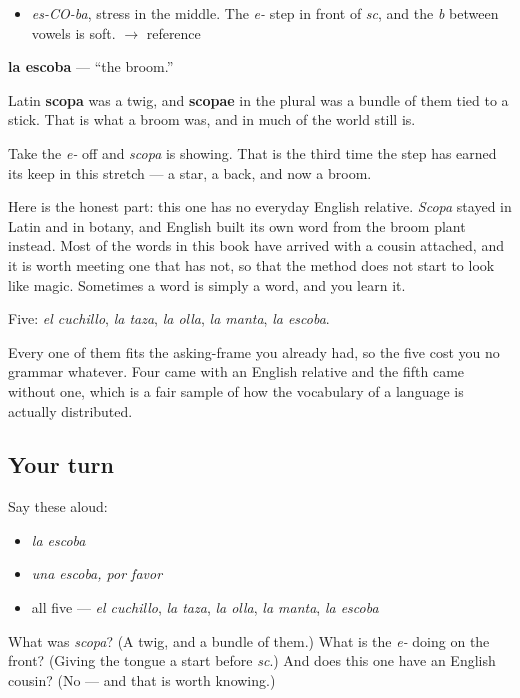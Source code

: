 \begin{sounds}
\begin{itemize}
\raggedright
  \item \emph{es-CO-ba}, stress in the middle. The \emph{e-} step in front of \emph{sc}, and the \emph{b} between vowels is soft. $\to$ reference
\end{itemize}
\end{sounds}

\begin{cousinweb}
\textbf{la escoba} — \textquotedblleft{}the broom.\textquotedblright{}

Latin \textbf{scopa} was a twig, and \textbf{scopae} in the plural was a bundle of them tied to a stick. That is what a broom was, and in much of the world still is.

Take the \emph{e-} off and \emph{scopa} is showing. That is the third time the step has earned its keep in this stretch — a star, a back, and now a broom.

Here is the honest part: this one has no everyday English relative. \emph{Scopa} stayed in Latin and in botany, and English built its own word from the broom plant instead. Most of the words in this book have arrived with a cousin attached, and it is worth meeting one that has not, so that the method does not start to look like magic. Sometimes a word is simply a word, and you learn it.
\end{cousinweb}

\begin{grammarlens}[title={What you've built}]
Five: \emph{el cuchillo}, \emph{la taza}, \emph{la olla}, \emph{la manta}, \emph{la escoba}.

Every one of them fits the asking-frame you already had, so the five cost you no grammar whatever. Four came with an English relative and the fifth came without one, which is a fair sample of how the vocabulary of a language is actually distributed.
\end{grammarlens}

\subsection*{Your turn}
Say these aloud:

\begin{itemize}
\raggedright
  \item \emph{la escoba}
  \item \emph{una escoba, por favor}
  \item all five — \emph{el cuchillo}, \emph{la taza}, \emph{la olla}, \emph{la manta}, \emph{la escoba}
\end{itemize}

\begin{tcolorbox}[breakable,colback=teal!4,colframe=teal!35!black,title={Before you move on}]
What was \emph{scopa}? (A twig, and a bundle of them.) What is the \emph{e-} doing on the front? (Giving the tongue a start before \emph{sc}.) And does this one have an English cousin? (No — and that is worth knowing.)
\end{tcolorbox}
